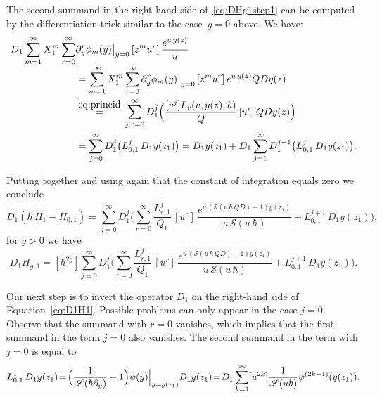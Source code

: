 \documentclass[JEP,XML,SOM,Unicode,NoEqCountersInSection,NoFloatCountersInSection]{cedram}
\let\mathcal\mathscr
\theoremstyle{plain}
\theoremstyle{definition}
\theoremstyle{remark}
\newcommand{\cS}{\mathcal{S}}
\begin{document}
The second summand in the right-hand side of~\eqref{eq:DHg1step1} can be computed by the differentiation trick similar to the case~$g=0$ above. We have:\vspace*{-3pt}
\begin{align*}
D_1\sum_{m=1}^\infty X_1^m\sum_{r=0}^\infty&
\partial_y^r\phi_m(y)\big|_{y=0}\,[z^{m}u^r]\,
\frac{e^{u\,y(z)}}{u}\\[-3pt]
&=\sum_{m=1}^\infty X_1^m\sum_{r=0}^\infty
\partial_y^r\phi_m(y)\big|_{y=0}\,[z^{m}u^r]\,
e^{u\,y(z)}QDy(z)
\\&\!\mathop{=}^{\eqref{eq:princid}}
\sum_{j,r=0}^\infty D_1^j \Bigl(\frac{[v^j]L_r(v,y(z),\hbar)}{Q}\,[u^r]\, QDy(z) \Bigr)
\\&=\sum_{j=0}^\infty D_1^j\bigl(L_{0,1}^j\,D_1y(z_1)\bigr)
=D_1y(z_1)+D_1\sum_{j=1}^\infty D_1^{j-1}\bigl(L_{0,1}^j\, D_1y(z_1)\bigr).
\end{align*}

Putting together and using again that the constant of integration equals zero we conclude\vspace*{-5pt}
\begin{equation*}\label{eq:D1H1}
D_1(\hbar\,H_{1}-H_{0,1})=
\sum_{j=0}^\infty D_1^j\biggl(\sum_{r=0}^\infty\frac{L_{r,1}^j}{Q_1}
\,[u^r]\, \frac{e^{u\,(\cS(u\,\hbar\,Q D)-1)y(z_1)}}{u\,\cS(u\,\hbar)}+L_{0,1}^{j+1}\, D_1y(z_1) \biggr),
\end{equation*}
\ie for $g>0$ we have\vspace*{-5pt}
\begin{equation*}
D_1 H_{g,1}=[\hbar^{2g}]
\sum_{j=0}^\infty D_1^j \biggl(\sum_{r=0}^\infty\frac{L_{r,1}^j}{Q_1}
\,[u^r]\, \frac{e^{u\,(\cS(u\,\hbar\,Q D)-1)y(z_1)}}{u\,\cS(u\,\hbar)}+L_{0,1}^{j+1}\, D_1y(z_1) \biggr).
\end{equation*}

Our next step is to invert the operator $D_1$ on the right-hand side of Equation~\ref{eq:D1H1}. Possible problems can only appear in the case $j=0$. Observe that the summand with $r=0$ vanishes, which implies that the first summand in the term $j=0$ also vanishes. The second summand in the term with $j=0$ is equal to\vspace*{-5pt}
\[
L_{0,1}^1\,D_1 y(z_1)
\!=\!\Bigl(\frac1{\cS(\hbar \partial_y)}-1\Bigr)\psi(y)\Big|_{y=y(z_1)}D_1 y(z_1)
\!=\!D_1\sum_{k=1}^\infty[u^{2k}]\frac1{\cS(u \hbar)}\psi^{(2k-1)}(y(z_1)).
\]
\end{document}
